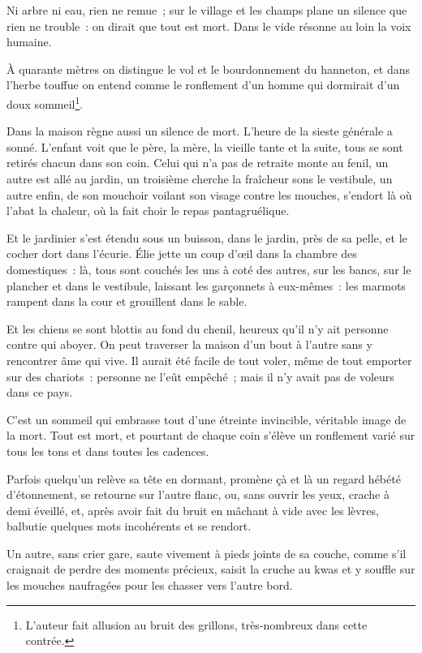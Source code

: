 \documentclass[french,twoside]{book} %
\begin{document}
Ni arbre ni eau, rien ne remue ; sur le village et les champs plane un silence que rien ne trouble : on dirait que tout est mort. Dans le vide résonne au loin la voix humaine.\par
À quarante mètres on distingue le vol et le bourdonnement du hanneton, et dans l’herbe touffue on entend comme le ronflement d’un homme qui dormirait d’un doux sommeil\footnote{L’auteur fait allusion au bruit des grillons, très-nombreux dans cette contrée.}.\par
Dans la maison règne aussi un silence de mort. L’heure de la sieste générale a sonné. L’enfant voit que le père, la mère, la vieille tante et la suite, tous se sont retirés chacun dans son coin. Celui qui n’a pas de retraite monte au fenil, un autre est allé au jardin, un troisième cherche la fraîcheur sons le vestibule, un autre enfin, de son mouchoir voilant son visage contre les mouches, s’endort là où l’abat la chaleur, où la fait choir le repas pantagruélique.\par
Et le jardinier s’est étendu sous un buisson, dans le jardin, près de sa pelle, et le cocher dort dans l’écurie. Élie jette un coup d’œil dans la chambre des domestiques : là, tous sont couchés les uns à coté des autres, sur les bancs, sur le plancher et dans le vestibule, laissant les garçonnets à eux-mêmes : les marmots rampent dans la cour et grouillent dans le sable.\par
Et les chiens se sont blottis au fond du chenil, heureux qu’il n’y ait personne contre qui aboyer. On peut traverser la maison d’un bout à l’autre sans y rencontrer âme qui vive. Il aurait été facile de tout voler, même de tout emporter sur des chariots : personne ne l’eût empêché ; mais il n’y avait pas de voleurs dans ce pays.\par
C’est un sommeil qui embrasse tout d’une étreinte invincible, véritable image de la mort. Tout est mort, et pourtant de chaque coin s’élève un ronflement varié sur tous les tons et dans toutes les cadences.\par
Parfois quelqu’un relève sa tête en dormant, promène çà et là un regard hébété d’étonnement, se retourne sur l’autre flanc, ou, sans ouvrir les yeux, crache à demi éveillé, et, après avoir fait du bruit en mâchant à vide avec les lèvres, balbutie quelques mots incohérents et se rendort.\par
Un autre, sans crier gare, saute vivement à pieds joints de sa couche, comme s’il craignait de perdre des moments précieux, saisit la cruche au kwas et y souffle sur les mouches naufragées pour les chasser vers l’autre bord.\par
\end{document}
